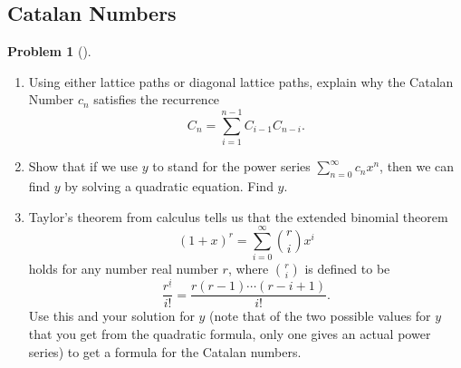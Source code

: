 \documentclass[10pt,]{book}
\theoremstyle{plain}
\theoremstyle{definition}
\newtheorem{activity}[project]{Problem}
\theoremstyle{definition}
\numberwithin{equation}{chapter}
\newcommand{\importantarrow}{\Rightarrow}
\begin{document}
\subsection[{Catalan Numbers}]{Catalan Numbers}\label{subsection-50}
\begin{activity}[]\marginsymbol[-1em]{\pdftooltip{$\importantarrow$}{especially interesting}} \label{CatalanRecurrence}
\leavevmode%
\begin{enumerate}[font=\bfseries,label=(\alph*),ref=\alph*]
\item\label{task-165} \marginsymbol[-2.5em]{} Using either lattice paths or diagonal lattice paths, explain why the Catalan Number \(c_n\) satisfies the recurrence%
\begin{equation*}
C_n = \sum_{i=1}^{n-1} C_{i-1}C_{n-i}\text{.}
\end{equation*}
%
\item\label{task-166} \marginsymbol[-2.5em]{} Show that if we use \(y\) to stand for the power series \(\sum_{n=0}^\infty c_nx^n\), then we can find \(y\) by solving a quadratic equation. Find \(y\).%
\item\label{task-167} \marginsymbol[-2.5em]{} Taylor's theorem from calculus tells us that the extended binomial theorem%
\begin{equation*}
(1+x)^r = \sum_{i=0}^\infty \binom{r}{i}x^i
\end{equation*}
holds for any number real number \(r\), where \(\binom{r}{i}\) is defined to be%
\begin{equation*}
\frac{r^{\underline{i}}}{i!} = \frac{r(r-1)\cdots(r-i+1)}{i!}  \text{.}
\end{equation*}
Use this and your solution for \(y\) (note that of the two possible values for \(y\) that you get from the quadratic formula, only one gives an actual power series) to get a formula for the Catalan numbers.%
\end{enumerate}
\end{activity}
\typeout{************************************************}
\typeout{************************************************}
\end{document}
